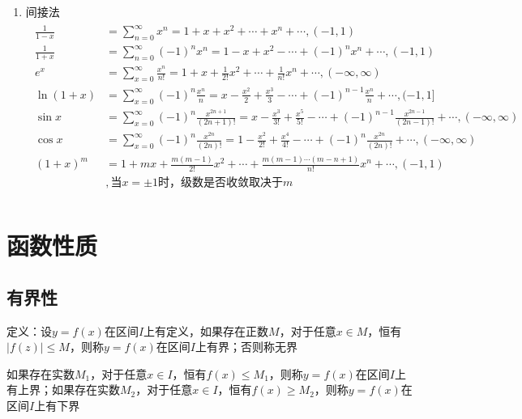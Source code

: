 \documentclass[12pt]{book}
\begin{document}
\begin{enumerate}[1.]
    \item 间接法
    \begin{gather*}
        \begin{aligned}
            \frac{1}{1-x} &= \sum_{n=0}^{\infty}{x^n} = 1 + x + x^2 + \cdots + x^n + \cdots , (-1,1) \\
            \frac{1}{1+x} &= \sum_{n=0}^{\infty}{(-1)^{n}x^{n}} = 1 - x + x^2 - \cdots + (-1)^{n}x^{n} + \cdots , (-1,1) \\
            e^x &= \sum_{x=0}^{\infty}{\frac{x^n}{n!}} = 1 + x + \frac{1}{2!}x^2 + \cdots + \frac{1}{n!}x^n + \cdots , (-\infty,\infty) \\
            \ln{(1+x)}&= \sum_{x=0}^{\infty}{(-1)^{n}\frac{x^{n}}{n} } = x - \frac{x^2}{2} + \frac{x^3}{3} - \cdots +(-1)^{n-1}\frac{x^{n}}{n}+\cdots ,(-1,1] \\
            \sin{x} &= \sum_{x=0}^{\infty}{(-1)^{n}\frac{x^{2n+1}}{(2n+1)!} }= x - \frac{x^3}{3!} + \frac{x^5}{5!} - \cdots +(-1)^{n-1}\frac{x^{2n-1}}{(2n-1)!}+\cdots ,(-\infty,\infty) \\
            \cos{x} &= \sum_{x=0}^{\infty}{(-1)^{n}\frac{x^{2n}}{(2n)!} }= 1 - \frac{x^2}{2!} + \frac{x^4}{4!} - \cdots +(-1)^{n}\frac{x^{2n}}{(2n)!}+\cdots ,(-\infty,\infty) \\
            (1+x)^{m}& = 1+mx+\frac{m(m-1)}{2!}x^{2}+\cdots+\frac{m(m-1)\cdots (m-n+1)}{n!}x^{n}+\cdots, (-1,1)\\ 
            &,\text{当}x=\pm 1\text{时，级数是否收敛取决于}m \\
        \end{aligned}
    \end{gather*}
\end{enumerate}





\section{函数性质}


\subsection{有界性}

定义：设$y=f(x)$在区间$I$上有定义，如果存在正数$M$，对于任意$ x \in M$，恒有$|f(z)|\leq M$，则称$y=f(x)$在区间$I$上有界；否则称无界

如果存在实数$M_1$，对于任意$x\in I$，恒有$f(x)\leq M_1$，则称$y=f(x)$在区间$I$上有上界；如果存在实数$ M_2$，对于任意$x\in  I$，恒有$ f(x)\geq M_2$，则称$y=f(x)$在区间$I$上有下界
\end{document}
